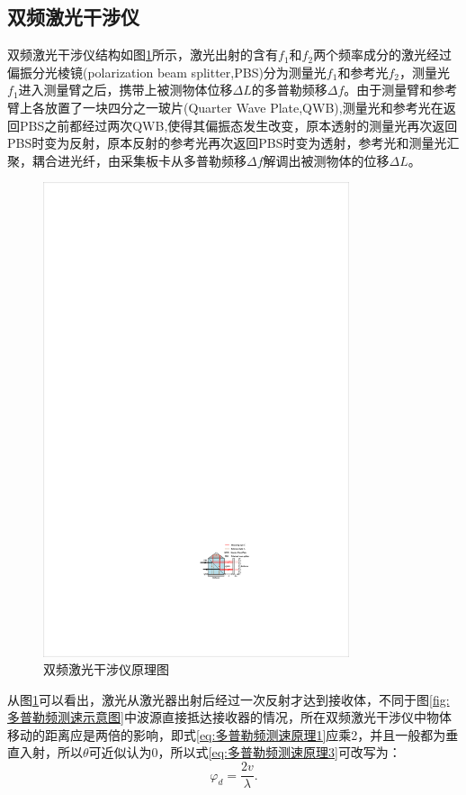 \subsection{双频激光干涉仪}
双频激光干涉仪结构如图\ref{fig:双频激光干涉仪原理图}所示，激光出射的含有\(f_1\)和\(f_2\)两个频率成分的激光经过偏振分光棱镜(polarization beam splitter,PBS)分为测量光\(f_1\)和参考光\(f_2\)，测量光\(f_1\)进入测量臂之后，携带上被测物体位移\(\Delta L\)的多普勒频移\(\Delta f\)。由于测量臂和参考臂上各放置了一块四分之一玻片(Quarter Wave Plate,QWB),测量光和参考光在返回PBS之前都经过两次QWB,使得其偏振态发生改变，原本透射的测量光再次返回PBS时变为反射，原本反射的参考光再次返回PBS时变为透射，参考光和测量光汇聚，耦合进光纤，由采集板卡从多普勒频移\(\Delta f\)解调出被测物体的位移\(\Delta L\)。
\begin{figure}[htb]
    \centering
    \includegraphics[width=9cm]{fig/2-fig/双频激光干涉仪原理图.pdf}
    \caption{双频激光干涉仪原理图}
    \label{fig:双频激光干涉仪原理图}
\end{figure}

从图\ref{fig:双频激光干涉仪原理图}可以看出，激光从激光器出射后经过一次反射才达到接收体，不同于图\ref{fig:多普勒频测速示意图}中波源直接抵达接收器的情况，所在双频激光干涉仪中物体移动的距离应是两倍的影响，即式\eqref{eq:多普勒频测速原理1}应乘2，并且一般都为垂直入射，所以\(\theta\)可近似认为0，所以式\eqref{eq:多普勒频测速原理3}可改写为：
\begin{equation}\label{eq:干涉仪中多普勒相位}
  \varphi_d = \frac{2v}{\lambda}.
\end{equation}

